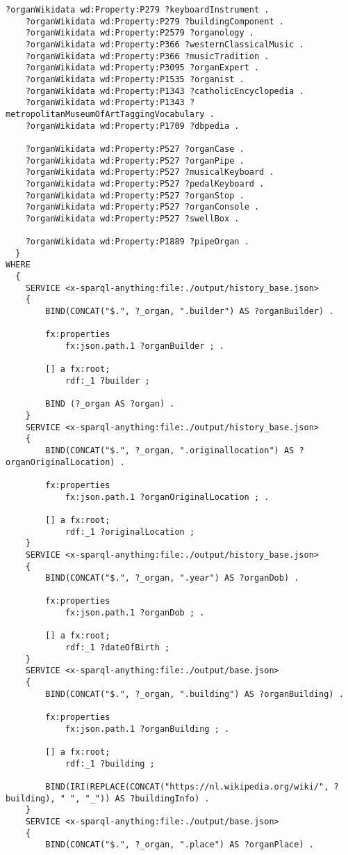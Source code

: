 \begin{lstlisting}[caption={organ-details.sparql}]
	?organWikidata wd:Property:P279 ?keyboardInstrument .
	?organWikidata wd:Property:P279 ?buildingComponent .
	?organWikidata wd:Property:P2579 ?organology .
	?organWikidata wd:Property:P366 ?westernClassicalMusic .
	?organWikidata wd:Property:P366 ?musicTradition .
	?organWikidata wd:Property:P3095 ?organExpert .
	?organWikidata wd:Property:P1535 ?organist .
	?organWikidata wd:Property:P1343 ?catholicEncyclopedia .
	?organWikidata wd:Property:P1343 ?metropolitanMuseumOfArtTaggingVocabulary .
	?organWikidata wd:Property:P1709 ?dbpedia .

	?organWikidata wd:Property:P527 ?organCase .
	?organWikidata wd:Property:P527 ?organPipe .
	?organWikidata wd:Property:P527 ?musicalKeyboard .
	?organWikidata wd:Property:P527 ?pedalKeyboard .
	?organWikidata wd:Property:P527 ?organStop .
	?organWikidata wd:Property:P527 ?organConsole .
	?organWikidata wd:Property:P527 ?swellBox .

	?organWikidata wd:Property:P1889 ?pipeOrgan .
  }
WHERE
  { 
	SERVICE <x-sparql-anything:file:./output/history_base.json> 
	{
		BIND(CONCAT("$.", ?_organ, ".builder") AS ?organBuilder) .

		fx:properties
			fx:json.path.1 ?organBuilder ; .

		[] a fx:root; 
			rdf:_1 ?builder ; 

		BIND (?_organ AS ?organ) .
	} 
	SERVICE <x-sparql-anything:file:./output/history_base.json> 
	{
		BIND(CONCAT("$.", ?_organ, ".originallocation") AS ?organOriginalLocation) .

		fx:properties
			fx:json.path.1 ?organOriginalLocation ; .

		[] a fx:root; 
			rdf:_1 ?originalLocation ;
	} 
	SERVICE <x-sparql-anything:file:./output/history_base.json> 
	{
		BIND(CONCAT("$.", ?_organ, ".year") AS ?organDob) .

		fx:properties
			fx:json.path.1 ?organDob ; .

		[] a fx:root; 
			rdf:_1 ?dateOfBirth ;
	} 
	SERVICE <x-sparql-anything:file:./output/base.json>
	{
		BIND(CONCAT("$.", ?_organ, ".building") AS ?organBuilding) .

		fx:properties
			fx:json.path.1 ?organBuilding ; .

		[] a fx:root; 
			rdf:_1 ?building ;

		BIND(IRI(REPLACE(CONCAT("https://nl.wikipedia.org/wiki/", ?building), " ", "_")) AS ?buildingInfo) . 
	} 
	SERVICE <x-sparql-anything:file:./output/base.json>
	{
		BIND(CONCAT("$.", ?_organ, ".place") AS ?organPlace) .


\end{lstlisting}
